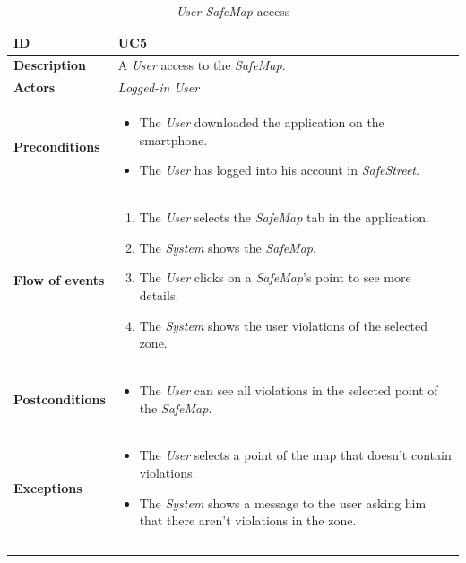 \documentclass {article}
\begin{document}
	\begin{longtable}{| p{3 cm} | p{10.5 cm} |} 
			\hline
			{\bf ID} & UC5 \\
			\hline
			{\bf Description} & A {\it User} access to the {\it SafeMap}.\\
			\hline
			{\bf Actors} & {\it Logged-in User}\\
			\hline
			{\bf Preconditions} & 	
			\begin{itemize}
				\item The {\it User} downloaded the application on the smartphone.
				\item The {\it User} has logged into his account in {\it SafeStreet}.
			\end{itemize}
			\\
			\hline
			{\bf Flow of events} &	
			\begin{enumerate}
				\item The {\it User} selects the {\it SafeMap} tab in the application.
				\item The {\it System} shows the {\it SafeMap}.
				\item The {\it User} clicks on a {\it SafeMap}'s point to see more details. 
				\item The {\it System} shows the user violations of the selected zone. 
			\end{enumerate}
			\\
			\hline
			{\bf Postconditions} & 
			\begin{itemize}
				\item The {\it User} can see all violations in the selected point of the {\it SafeMap}.
			\end{itemize}
			\\
			\hline
			{\bf Exceptions} & 	
			\begin{itemize}
				\item The {\it User} selects a point of the map that doesn't contain violations.
				\item The {\it System} shows a message to the user asking him that there aren't violations in the zone.
			\end{itemize}
			\\ \\
			\hline
			\caption{{\it User SafeMap} access}
			\end{longtable}
			
\end{document}
